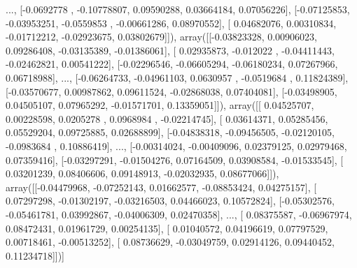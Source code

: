 \documentclass{article}
\begin{document}
       ..., 
       [-0.0692778 , -0.10778807,  0.09590288,  0.03664184,  0.07056226],
       [-0.07125853, -0.03953251, -0.0559853 , -0.00661286,  0.08970552],
       [ 0.04682076,  0.00310834, -0.01712212, -0.02923675,  0.03802679]]), array([[-0.03823328,  0.00906023,  0.09286408, -0.03135389, -0.01386061],
       [ 0.02935873, -0.012022  , -0.04411443, -0.02462821,  0.00541222],
       [-0.02296546, -0.06605294, -0.06180234,  0.07267966,  0.06718988],
       ..., 
       [-0.06264733, -0.04961103,  0.0630957 , -0.0519684 ,  0.11824389],
       [-0.03570677,  0.00987862,  0.09611524, -0.02868038,  0.07404081],
       [-0.03498905,  0.04505107,  0.07965292, -0.01571701,  0.13359051]]), array([[ 0.04525707,  0.00228598,  0.0205278 ,  0.0968984 , -0.02214745],
       [ 0.03614371,  0.05285456,  0.05529204,  0.09725885,  0.02688899],
       [-0.04838318, -0.09456505, -0.02120105, -0.0983684 ,  0.10886419],
       ..., 
       [-0.00314024, -0.00409096,  0.02379125,  0.02979468,  0.07359416],
       [-0.03297291, -0.01504276,  0.07164509,  0.03908584, -0.01533545],
       [ 0.03201239,  0.08406606,  0.09148913, -0.02032935,  0.08677066]]), array([[-0.04479968, -0.07252143,  0.01662577, -0.08853424,  0.04275157],
       [ 0.07297298, -0.01302197, -0.03216503,  0.04466023,  0.10572824],
       [-0.05302576, -0.05461781,  0.03992867, -0.04006309,  0.02470358],
       ..., 
       [ 0.08375587, -0.06967974,  0.08472431,  0.01961729,  0.00254135],
       [ 0.01040572,  0.04196619,  0.07797529,  0.00718461, -0.00513252],
       [ 0.08736629, -0.03049759,  0.02914126,  0.09440452,  0.11234718]])]
\end{document}
